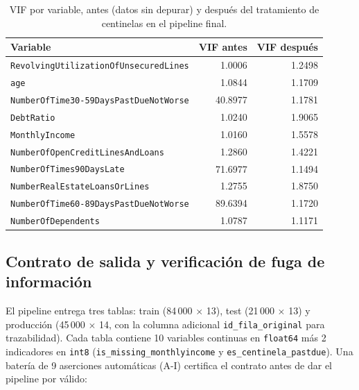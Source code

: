 \documentclass[11pt,a4paper]{article}
\begin{document}
\begin{table}[H]
\centering
\caption{VIF por variable, antes (datos sin depurar) y despu\'es del tratamiento de centinelas en el pipeline final.}
\label{tab:vif_antes_despues}
\begin{tabular}{lrr}
\toprule
Variable & VIF antes & VIF despu\'es \\
\midrule
\texttt{RevolvingUtilizationOfUnsecuredLines} & 1.0006 & 1.2498 \\
\texttt{age} & 1.0844 & 1.1709 \\
\texttt{NumberOfTime30-59DaysPastDueNotWorse} & 40.8977 & 1.1781 \\
\texttt{DebtRatio} & 1.0240 & 1.9065 \\
\texttt{MonthlyIncome} & 1.0160 & 1.5578 \\
\texttt{NumberOfOpenCreditLinesAndLoans} & 1.2860 & 1.4221 \\
\texttt{NumberOfTimes90DaysLate} & 71.6977 & 1.1494 \\
\texttt{NumberRealEstateLoansOrLines} & 1.2755 & 1.8750 \\
\texttt{NumberOfTime60-89DaysPastDueNotWorse} & 89.6394 & 1.1720 \\
\texttt{NumberOfDependents} & 1.0787 & 1.1171 \\
\bottomrule
\end{tabular}
\end{table}

\subsection{Contrato de salida y verificaci\'on de fuga de informaci\'on}

El pipeline entrega tres tablas: train (84\,000 $\times$ 13), test (21\,000 $\times$ 13) y producci\'on (45\,000 $\times$ 14, con la columna adicional \texttt{id\_fila\_original} para trazabilidad). Cada tabla contiene 10 variables continuas en \texttt{float64} m\'as 2 indicadores en \texttt{int8} (\texttt{is\_missing\_monthlyincome} y \texttt{es\_centinela\_pastdue}). Una bater\'ia de 9 aserciones autom\'aticas (A-I) certifica el contrato antes de dar el pipeline por v\'alido:
\end{document}

